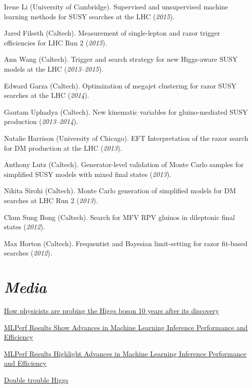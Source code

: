 \documentclass[11pt]{res}
\newcommand{\MarginText}[1]{\section{\textit{#1}}}
\begin{document}
\begin{resume}
\begin{itemize}
{    \item Irene Li (University of Cambridge). Supervised and unsupervised machine learning methods for SUSY searches at the LHC (\textit{2015}).
    \item Jared Filseth (Caltech). Measurement of single-lepton and razor trigger efficiencies for LHC Run 2 (\textit{2015}).
    \item Ann Wang (Caltech). Trigger and search strategy for new Higgs-aware SUSY models at the LHC (\textit{2013--2015}).
    \item Edward Garza (Caltech). Optimization of megajet clustering for razor SUSY searches at the LHC (\textit{2014}).
    \item Gautam Uphadya (Caltech). New kinematic variables for gluino-mediated SUSY production (\textit{2013--2014}).
    \item Natalie Harrison (University of Chicago). EFT Interpretation of the razor search for DM production at the LHC (\textit{2013}).
    \item Anthony Lutz (Caltech). Generator-level validation of Monte Carlo samples for simplified SUSY models with mixed final states (\textit{2013}).
    \item Nikita Sirohi (Caltech). Monte Carlo generation of simplified models for DM searches at LHC Run 2 (\textit{2013}).
    \item Chun Sung Bong (Caltech). Search for MFV RPV gluinos in dileptonic final states (\textit{2012}).
    \item Max Horton (Caltech). Frequentist and Bayesian limit-setting for razor fit-based searches (\textit{2012}).
          }{}
  \end{itemize}


  \MarginText{Media}

  \href{https://www.sciencenews.org/article/higgs-boson-particle-physics-standard-model-discovery-anniversary}{How physicists are probing the Higgs boson 10 years after its discovery}

  \href{https://mlcommons.org/en/news/mlperf-inference-1q2022/}{MLPerf Results Show Advances in Machine Learning Inference Performance and Efficiency}

  \href{https://insidehpc.com/2022/04/mlperf-results-highlight-advances-in-machine-learning-inference-performance-and-efficiency/}{MLPerf Results Highlight Advances in Machine Learning Inference Performance and Efficiency}

  \href{https://www.symmetrymagazine.org/article/double-trouble-higgs}{Double trouble Higgs}


\end{resume}
\end{document}
